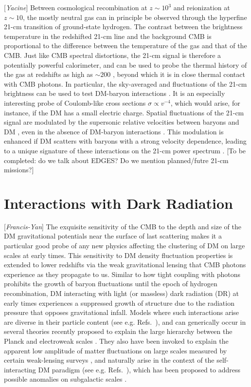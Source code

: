 \documentclass[12pt]{article}
\newcommand{\Contributors}[1]{ {\footnotesize [\textit{#1}]}}
\begin{document}
\Contributors{Yacine} Between cosmological recombination at $z \sim 10^3$ and reionization at $z \sim 10$, the mostly neutral gas can in principle be observed through the hyperfine 21-cm transition of ground-state hydrogen. The contrast between the brightness temperature in the redshifted 21-cm line and the background CMB is proportional to the difference between the temperature of the gas and that of the CMB. Just like CMB spectral distortions, the 21-cm signal is therefore a potentially powerful calorimeter, and can be used to probe the thermal history of the gas at redshifts as high as $\sim 200$ \cite{Loeb_04, Breysse_18}, beyond which it is in close thermal contact with CMB photons. In particular, the sky-averaged and fluctuations of the 21-cm brightness can be used to test DM-baryon interactions \cite{Tashiro_14}. It is an especially interesting probe of Coulomb-like cross sections $\sigma \propto v^{-4}$, which would arise, for instance, if the DM has a small electric charge. Spatial fluctuations of the 21-cm signal are modulated by the supersonic relative velocities between baryons and DM \cite{Tseliakhovich_10}, even in the absence of DM-baryon interactions \cite{AliHaimoud_14}. This modulation is enhanced if DM scatters with baryons with a strong velocity dependence, leading to a unique signature of these interactions on the 21-cm power spectrum \cite{Munoz_15, Barkana_18, Fialkov_18, Munoz_18}. [To be completed: do we talk about EDGES? Do we mention planned/futre 21-cm missions?]

\section{Interactions with Dark Radiation}
\Contributors{Francis-Yan}
The exquisite sensitivity of the CMB to the depth and size of the DM gravitational potentials near the surface of last scattering makes it a particular good probe of any new physics affecting the clustering of DM on large scales at early times. This sensitivity to DM density fluctuation properties is extended to lower redshifts via the weak gravitational lensing that CMB photons experience as they propagate to us. Similar to how tight coupling with photons prohibits the growth of baryon fluctuations until the epoch of hydrogen recombination, DM interacting with light (or massless) dark radiation (DR) at early times experiences a suppressed growth of structure due to the radiation pressure that opposes gravitational infall. Models where such interactions arise are diverse in their particle content (see e.g. Refs.~\cite{Aarssen:2012fx,Cyr-Racine:2013fsa,Buen-Abad:2015ova}), and can generically occur in several theories recently proposed to explain the large hierarchy between the Planck and electroweak scales \cite{Arkani-Hamed:2016rle, Chacko:2018vss}. They also have been invoked to explain the apparent low amplitude of matter fluctuations on large scales measured by certain weak-lensing surveys \cite{Lesgourgues:2015wza,Chacko:2016kgg,Buen-Abad:2017gxg,Krall:2017xcw}, and naturally arise in the context of the self-interacting DM paradigm (see e.g. Refs.~\cite{Tulin:2012wi,Tulin:2013teo,Kaplinghat:2015aga}), which has been proposed to address possible anomalies on subgalactic scales \cite{Bullock:2017xww}. 
\end{document}
